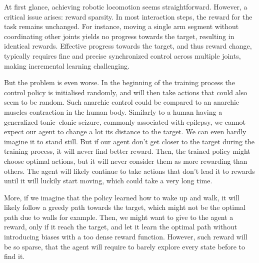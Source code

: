 At first glance, achieving robotic locomotion seems straightforward.
However, a critical issue arises: reward sparsity.
In most interaction steps, the reward for the task remains unchanged.
For instance, moving a single arm segment without coordinating other joints yields no progress towards the target, resulting in identical rewards.
Effective progress towards the target, and thus reward change, typically requires fine and precise synchronized control across multiple joints, making incremental learning challenging.

But the problem is even worse.
In the beginning of the training process the control policy is initialised randomly, and will then take actions that
could also seem to be random.
Such anarchic control could be compared to an anarchic muscles contraction in the human body.
Similarly to a human having a generalized tonic–clonic seizure, commonly associated with epilepsy, we cannot expect our
agent to change a lot its distance to the target.
We can even hardly imagine it to stand still.
But if our agent don't get closer to the target during the training process, it will never find better reward.
Then, the trained policy might choose optimal actions, but it will never consider them as more rewarding than others.
The agent will likely continue to take actions that don't lead it to rewards until it will luckily start moving, which
could take a very long time.

More, if we imagine that the policy learned how to wake up and walk, it will likely follow a greedy path towards the
target, which might not be the optimal path due to walls for example.
Then, we might want to give to the agent a reward, only if it reach the target, and let it learn the optimal path
without introducing biases with a too dense reward function.
However, such reward will be so sparse, that the agent will require to barely explore every state before to find it.

